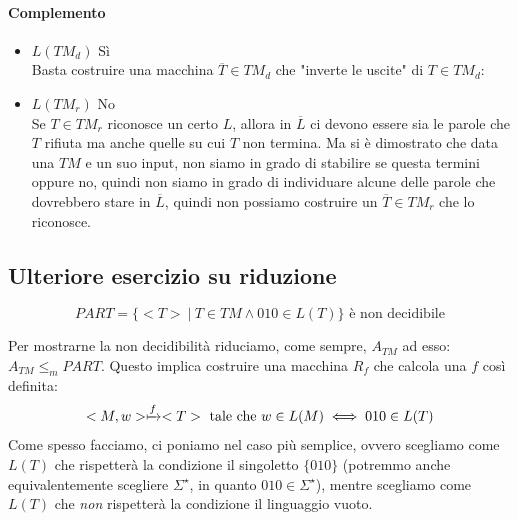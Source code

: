 \paragraph{Complemento}
\begin{itemize}
\item $L(TM_d)$ Sì \\
Basta costruire una macchina $\overline{T} \in TM_d$ che "inverte le uscite" di $T \in TM_d$:

\item $L(TM_r)$ No \\
Se $T \in TM_r$ riconosce un certo $L$, allora in $\overline{L}$ ci devono essere sia le parole che $T$ rifiuta ma anche quelle su cui $T$ non termina. Ma si è dimostrato che data una $TM$ e un suo input, non siamo in grado di stabilire se questa termini oppure no, quindi non siamo in grado di individuare alcune delle parole che dovrebbero stare in $\overline{L}$, quindi non possiamo costruire un $\overline{T} \in TM_r$ che lo riconosce. 

\end{itemize}

\subsection{Ulteriore esercizio su riduzione}

\[
	PART = \{ <T> \ | \ T \in TM \land 010 \in L(T) \} \text{ è non decidibile}
\]

Per mostrarne la non decidibilità riduciamo, come sempre, $A_{TM}$ ad esso: $A_{TM} \leq_m PART$. Questo implica costruire una macchina $R_f$ che calcola una $f$ così definita:
\[
	<M, w> \xmapsto{f} <T> \text{ tale che } w \in L(M) \iff 010 \in L(T)
\]
Come spesso facciamo, ci poniamo nel caso più semplice, ovvero scegliamo come $L(T)$ che rispetterà la condizione il singoletto $\{ 010 \}$ (potremmo anche equivalentemente scegliere $\Sigma^{\star}$, in quanto $010 \in \Sigma^{\star}$), mentre scegliamo come $L(T)$ che \textit{non} rispetterà la condizione il linguaggio vuoto.

